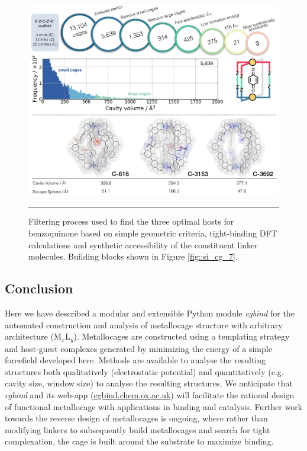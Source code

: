 \documentclass[../../main.tex]{subfiles}
\newcommand{\cgbind}{\emph{cgbind }}
\begin{document}
\begin{figure}[h!]
	\vspace{0.4cm}
	\centering
	\includegraphics[width=\textwidth]{3/cgbind/figs/fig8}
	\vspace{0.2cm}
	\hrule
	\caption{Filtering process used to find the three optimal hosts for benzoquinone based on simple geometric criteria, tight-binding DFT calculations and synthetic accessibility of the constituent linker molecules. Building blocks shown in Figure \ref{fig::si_cg_7}.}
	\label{fig::cg_8}
\end{figure}

\clearpage

\subsection{Conclusion}

Here we have described a modular and extensible Python module \cgbind for the automated construction and analysis of metallocage structure with arbitrary architecture (M$_x$L$_y$). Metallocages are constructed using a templating strategy and host-guest complexes generated by minimizing the energy of a simple forcefield developed here. Methods are available to analyse the resulting structures both qualitatively (electrostatic potential) and quantitatively (e.g. cavity size, window size) to analyse the resulting structures. We anticipate that \cgbind and its web-app ({\url{cgbind.chem.ox.ac.uk}}) will facilitate the rational design of functional metallocage with applications in binding and catalysis. Further work towards the reverse design of metallocages is ongoing, where rather than modifying linkers to subsequently build metallocages and search for tight complexation, the cage is built around the substrate to maximize binding.
\end{document}
